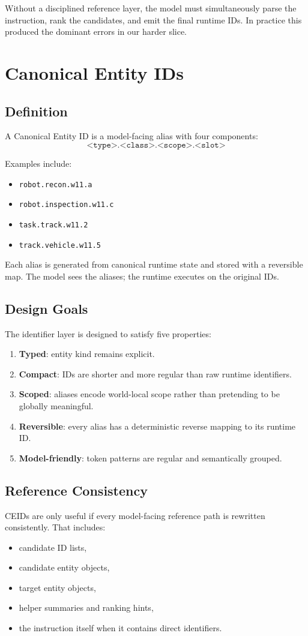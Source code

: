\documentclass[11pt]{article}
\begin{document}
Without a disciplined reference layer, the model must simultaneously parse the instruction, rank the candidates, and emit the final runtime IDs. In practice this produced the dominant errors in our harder slice.

\section{Canonical Entity IDs}
\subsection{Definition}
A Canonical Entity ID is a model-facing alias with four components:
\[
\texttt{<type>.<class>.<scope>.<slot>}
\]

Examples include:
\begin{itemize}[leftmargin=*]
  \item \texttt{robot.recon.w11.a}
  \item \texttt{robot.inspection.w11.c}
  \item \texttt{task.track.w11.2}
  \item \texttt{track.vehicle.w11.5}
\end{itemize}

Each alias is generated from canonical runtime state and stored with a reversible map. The model sees the aliases; the runtime executes on the original IDs.

\subsection{Design Goals}
The identifier layer is designed to satisfy five properties:
\begin{enumerate}[leftmargin=*,itemsep=0.25em]
  \item \textbf{Typed}: entity kind remains explicit.
  \item \textbf{Compact}: IDs are shorter and more regular than raw runtime identifiers.
  \item \textbf{Scoped}: aliases encode world-local scope rather than pretending to be globally meaningful.
  \item \textbf{Reversible}: every alias has a deterministic reverse mapping to its runtime ID.
  \item \textbf{Model-friendly}: token patterns are regular and semantically grouped.
\end{enumerate}

\subsection{Reference Consistency}
CEIDs are only useful if every model-facing reference path is rewritten consistently. That includes:
\begin{itemize}[leftmargin=*]
  \item candidate ID lists,
  \item candidate entity objects,
  \item target entity objects,
  \item helper summaries and ranking hints,
  \item the instruction itself when it contains direct identifiers.
\end{itemize}
\end{document}
